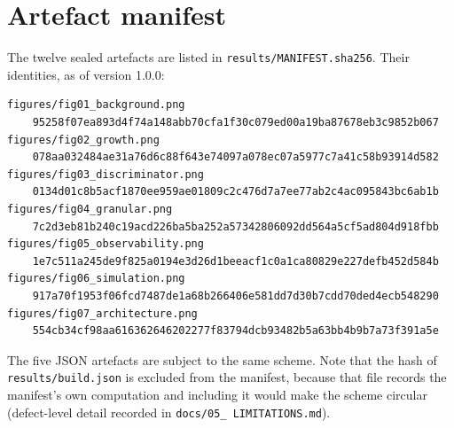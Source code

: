 \documentclass[11pt,a4paper]{article}
\theoremstyle{definition}
\begin{document}
\section{Artefact manifest}
\label{app:manifest}

The twelve sealed artefacts are listed in
\texttt{results/MANIFEST.sha256}. Their identities, as of version 1.0.0:

\begin{Verbatim}[fontsize=\scriptsize]
figures/fig01_background.png
    95258f07ea893d4f74a148abb70cfa1f30c079ed00a19ba87678eb3c9852b067
figures/fig02_growth.png
    078aa032484ae31a76d6c88f643e74097a078ec07a5977c7a41c58b93914d582
figures/fig03_discriminator.png
    0134d01c8b5acf1870ee959ae01809c2c476d7a7ee77ab2c4ac095843bc6ab1b
figures/fig04_granular.png
    7c2d3eb81b240c19acd226ba5ba252a57342806092dd564a5cf5ad804d918fbb
figures/fig05_observability.png
    1e7c511a245de9f825a0194e3d26d1beeacf1c0a1ca80829e227defb452d584b
figures/fig06_simulation.png
    917a70f1953f06fcd7487de1a68b266406e581dd7d30b7cdd70ded4ecb548290
figures/fig07_architecture.png
    554cb34cf98aa616362646202277f83794dcb93482b5a63bb4b9b7a73f391a5e
\end{Verbatim}

The five JSON artefacts are subject to the same scheme. Note that the hash of
\texttt{results/build.json} is excluded from the manifest, because that file
records the manifest's own computation and including it would make the scheme
circular (defect-level detail recorded in \texttt{docs/05\_
LIMITATIONS.md}).
\end{document}
